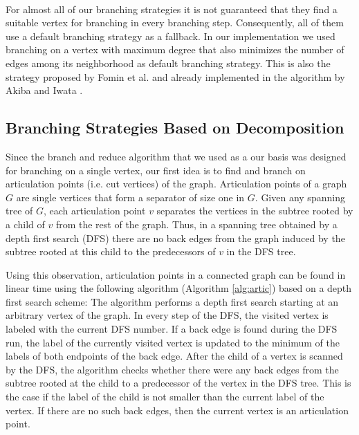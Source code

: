\documentclass[]{article}
\begin{document}
\paragraph{}

For almost all of our branching strategies it is not guaranteed that they find a suitable vertex for branching in every branching step. Consequently, all of them use a default branching strategy as a fallback. In our implementation we used branching on a vertex with maximum degree that also minimizes the number of edges among its neighborhood  as default branching strategy. This is also the strategy proposed by Fomin et al. \cite{Fomin} and already implemented in the algorithm by Akiba and Iwata \cite{AkibaIwata}.

\subsection{Branching Strategies Based on Decomposition} \label{decomp}
Since the branch and reduce algorithm that we used as a our basis was designed for branching on a single vertex, our first idea is to find and branch on articulation points  (i.e. cut vertices) of the graph. Articulation points of a graph $G$ are single vertices that form a separator of size one in $G$. Given any spanning tree of $G$, each articulation point $v$ separates the vertices in the subtree rooted by a child of $v$ from the rest of the graph. Thus, in a spanning tree obtained by a depth first search (DFS) there are no back edges from the graph induced by the subtree rooted at this child to the predecessors of $v$ in the DFS tree.

Using this observation, articulation points in a connected graph can be found in linear time using the following algorithm (Algorithm \ref{alg:artic}) based on a depth first search scheme: The algorithm performs a depth first search starting at an arbitrary vertex of the graph. In every step of the DFS, the visited vertex is labeled with the current DFS number. If a back edge is found during the DFS run, the label of the currently visited vertex is updated to the minimum of the labels of both endpoints of the back edge. After the child of a vertex is scanned by the DFS, the algorithm checks whether there were any back edges from the subtree rooted at the child to a predecessor of the vertex in the DFS tree. This is the case if the label of the child is not smaller than the current label of the vertex. If there are no such back edges, then the current vertex is an articulation point.
\end{document}
